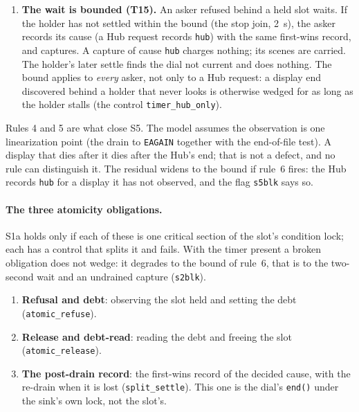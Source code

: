 \documentclass[a4paper,10pt,fleqn]{article}
\begin{document}
\begin{enumerate}
    and fails waiters with the Hub's error immediately, without fixing a cause.
    It does not capture, and it does not redial.
  \item \textbf{The wait is bounded (T15).}  An asker refused behind a held slot
    waits.  If the holder has not settled within the bound (the stop join,
    2~s), the asker records its cause (a Hub request records \texttt{hub}) with
    the same first-wins record, and captures.  A capture of cause \texttt{hub}
    charges nothing; its scenes are carried.  The holder's later settle finds the
    dial not current and does nothing.  The bound applies to \emph{every} asker,
    not only to a Hub request: a display end discovered behind a holder that
    never looks is otherwise wedged for as long as the holder stalls
    (the control \texttt{timer\_hub\_only}).
\end{enumerate}

Rules 4 and 5 are what close S5.  The model assumes the observation is one
linearization point (the drain to \texttt{EAGAIN} together with the end-of-file
test).  A display that dies after it dies after the Hub's end; that is not a
defect, and no rule can distinguish it.  The residual widens to the bound if
rule~6 fires: the Hub records \texttt{hub} for a display it has not observed, and
the flag \texttt{s5blk} says so.

\paragraph{The three atomicity obligations.}
S1a holds only if each of these is one critical section of the slot's condition
lock; each has a control that splits it and fails.  With the timer present a
broken obligation does not wedge: it degrades to the bound of rule~6, that is to
the two-second wait and an undrained capture (\texttt{s2blk}).
\begin{enumerate}
  \item \textbf{Refusal and debt}: observing the slot held and setting the debt
    (\texttt{atomic\_refuse}).
  \item \textbf{Release and debt-read}: reading the debt and freeing the slot
    (\texttt{atomic\_release}).
  \item \textbf{The post-drain record}: the first-wins record of the decided
    cause, with the re-drain when it is lost (\texttt{split\_settle}).  This one
    is the dial's \texttt{end()} under the sink's own lock, not the slot's.
\end{enumerate}
\end{document}
